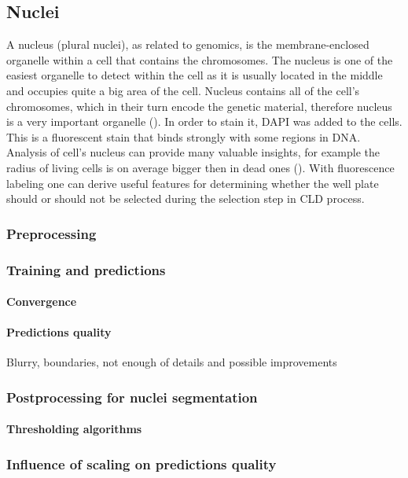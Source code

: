 \subsection{Nuclei}
    A nucleus (plural nuclei), as related to genomics, is the membrane-enclosed organelle within a cell that contains the chromosomes. The nucleus is one of the easiest organelle to detect within the cell as it is usually located in the middle and occupies quite a big area of the cell. Nucleus contains all of the cell's chromosomes, which in their turn encode the genetic material, therefore nucleus is a very important organelle (\cite{genomegov}). In order to stain it, DAPI was added to the cells. This is a fluorescent stain that binds strongly with some regions in DNA. Analysis of cell's nucleus can provide many valuable insights, for example the radius of living cells is on average bigger then in dead ones (\cite{Christiansen_2018}). With fluorescence labeling one can derive useful features for determining whether the well plate should or should not be selected during the selection step in CLD process.
    \subsubsection{Preprocessing}\label{section:nuclei-preprocessing}
        
    \subsubsection{Training and predictions}
        \paragraph{Convergence}
              
        \paragraph{Predictions quality}
              Blurry, boundaries, not enough of details and possible improvements
              
    \subsubsection{Postprocessing for nuclei segmentation}
        
        \paragraph{Thresholding algorithms}
        
    \subsubsection{Influence of scaling on predictions quality}
        
